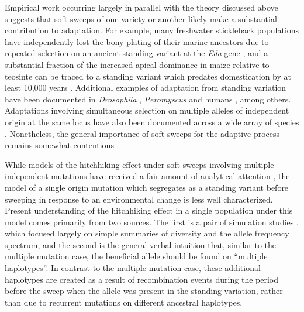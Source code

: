 \documentclass[a4paper,10pt]{article}
\begin{document}
Empirical work occurring largely in parallel with the theory discussed above suggests that soft sweeps of one variety or another likely make a substantial contribution to adaptation. For example, many freshwater stickleback populations have independently lost the bony plating of their marine ancestors due to repeated selection on an ancient standing variant at the \textit{Eda} gene \citep{Colosimo:2005ee}, and a substantial fraction of the increased apical dominance in maize relative to teosinte can be traced to a standing variant which predates domestication by at least 10,000 years \citep{Studer:2011bya}. Additional examples of adaptation from standing variation have been documented in \textit{Drosophila} \citep{Magwire:2011eq}, \textit{Peromyscus} \citep{Domingues:2012kw} and humans \citep{Peter:2012ht}, among others. Adaptations involving simultaneous selection on multiple alleles of independent origin at the same locus have also been documented across a wide array of species \citep{Menozzi:2004iu,Nair2007,Karasov:2010ij,Salgueiro:2010hx,Schmidt:2010bu,Jones:2013iw}. Nonetheless, the general importance of soft sweeps for the adaptive process remains somewhat contentious \citep[see e.g.][]{Jensen:2014hd}.

While models of the hitchhiking effect under soft sweeps involving multiple independent mutations have received a fair amount of analytical attention \citep{Pennings2006a,Pennings2006,Hermisson2008,Pokalyuk2012,Wilson:2014ke}, the model of a single origin mutation which segregates as a standing variant before sweeping in response to an environmental change is less well characterized. Present understanding of the hitchhiking effect in a single population under this model comes primarily from two sources. The first is a pair of simulation studies \citep{Innan:2004bk,Przeworski2005}, which focused largely on simple summaries of diversity and the allele frequency spectrum, and the second is the general verbal intuition that, similar to the multiple mutation case, the beneficial allele should be found on ``multiple haplotypes''. In contrast to the multiple mutation case, these additional haplotypes are created as a result of recombination events during the period before the sweep when the allele was present in the standing variation, rather than due to recurrent mutations on different ancestral haplotypes.
\end{document}
